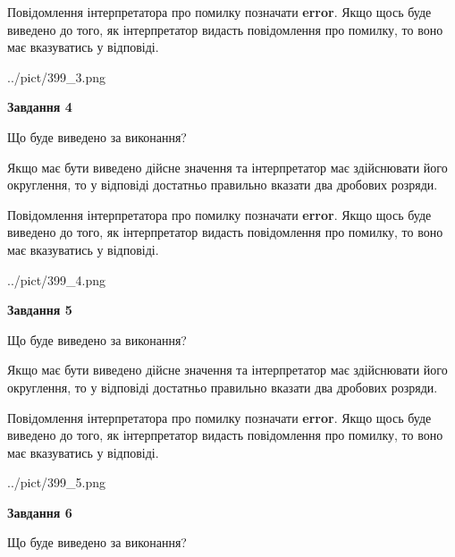 \documentclass[12pt, ukrainian]{article}
\begin{document}
{\begin {Large}
Повідомлення інтерпретатора про помилку позначати \textbf{error}.
Якщо щось буде виведено до того, як інтерпретатор видасть повідомлення про помилку, 
то воно має вказуватись у відповіді. \par

\begin{center}
	{../pict/399_3.png}
\end{center}
\newpage

{\begin {center}\textbf{Завдання 4}\end {center}}\par
Що буде виведено за виконання? \par

Якщо має бути виведено дійсне значення та інтерпретатор має здійснювати його округлення, 
то у відповіді достатньо правильно вказати два дробових розряди.

Повідомлення інтерпретатора про помилку позначати \textbf{error}.
Якщо щось буде виведено до того, як інтерпретатор видасть повідомлення про помилку, 
то воно має вказуватись у відповіді. \par

\begin{center}
	{../pict/399_4.png}
\end{center}
\newpage

{\begin {center}\textbf{Завдання 5}\end {center}}\par
Що буде виведено за виконання? \par

Якщо має бути виведено дійсне значення та інтерпретатор має здійснювати його округлення, 
то у відповіді достатньо правильно вказати два дробових розряди.

Повідомлення інтерпретатора про помилку позначати \textbf{error}.
Якщо щось буде виведено до того, як інтерпретатор видасть повідомлення про помилку, 
то воно має вказуватись у відповіді. \par

\begin{center}
	{../pict/399_5.png}
\end{center}
\newpage

{\begin {center}\textbf{Завдання 6}\end {center}}\par
Що буде виведено за виконання? \par


\end{Large}}
\end{document}
